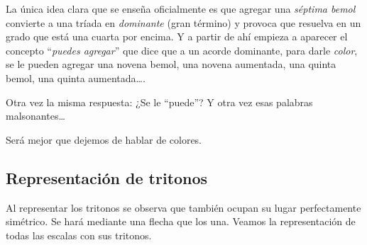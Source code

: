 \documentclass[]{article}
\begin{document}
La única idea clara que se enseña oficialmente es que agregar una \emph{séptima bemol} convierte a una tríada en \emph{dominante} (gran término) y provoca que resuelva en un grado que está una cuarta por encima. Y a partir de ahí empieza a aparecer el concepto ``\emph{puedes agregar}'' que dice que a un acorde dominante, para darle \emph{color}, se le pueden agregar una novena bemol, una novena aumentada, una quinta bemol, una quinta aumentada\ldots.

Otra vez la misma respuesta: ¿Se le ``puede''? Y otra vez esas palabras malsonantes\ldots{}

Será mejor que dejemos de hablar de colores.

\subsection{Representación de tritonos}

Al representar los tritonos se observa que también ocupan su lugar perfectamente simétrico. Se hará mediante una flecha que los una. Veamos la representación de todas las escalas con sus tritonos.
\end{document}
